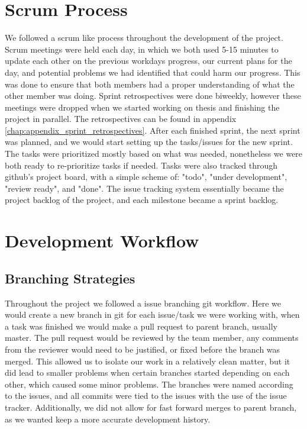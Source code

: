 \section{Scrum Process}
We followed a scrum like process throughout the development of the project.
Scrum meetings were held each day, in which we both used 5-15 minutes to update each
other on the previous workdays progress, our current plans for the day, and potential
problems we had identified that could harm our progress.
This was done to ensure that both members had a proper understanding of what the other
member was doing.
Sprint retrospectives were done biweekly, however these meetings were dropped when
we started working on thesis and finishing the project in parallel.
The retrospectives can be found in appendix \ref{chap:appendix_sprint_retrospectives}.
After each finished sprint, the next sprint was planned, and we would start setting
up the tasks/issues for the new sprint.
The tasks were prioritized mostly based on what was needed, nonetheless we were both
ready to re-prioritize tasks if needed.
Tasks were also tracked through github's project board, with a simple scheme of: "todo",
"under development", "review ready", and "done".
The issue tracking system essentially became the project backlog of the project, and
each milestone became a sprint backlog.

\section{Development Workflow}
\subsection{Branching Strategies}
Throughout the project we followed a issue branching git workflow.
Here we would create a new branch in git for each issue/task we were working with,
when a task was finished we would make a pull request to parent branch, usually master.
The pull request would be reviewed by the team member, any comments from the reviewer
would need to be justified, or fixed before the branch was merged.
This allowed us to isolate our work in a relatively clean matter, but
it did lead to smaller problems when certain branches started depending on each other,
which caused some minor problems.
The branches were named according to the issues, and all commits were tied to the issues
with the use of the issue tracker.
Additionally, we did not allow for fast forward merges to parent branch, as we wanted
keep a more accurate development history.

